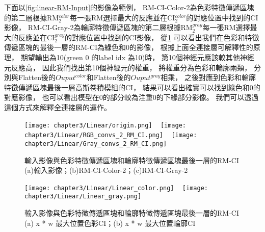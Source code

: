 \documentclass[class=NCU_thesis, crop=false]{standalone}
\begin{document}
下面以\cref{fig:linear-RM-Input}的影像為範例，
RM-CI-Color-2為色彩特徵傳遞區塊的第二層根據RM$^{color}_{2}$每一張RM選擇最大的反應並在CI$^{color}_{2}$的對應位置中找到的CI影像，
RM-CI-Gray-2為輪廓特徵傳遞區塊的第二層根據RM$^{gray}_{2}$每一張RM選擇最大的反應並在CI$^{gray}_{2}$的對應位置中找到的CI影像，
從\cref{fig:RM-CI}  可以看出我們在色彩和特徵傳遞區塊的最後一層的RM-CI為綠色和0的影像，
根據上面全連接層可解釋性的原理，
期望輸出為10(green 0 的label idx 為10)時，
第10個神經元應該較其他神經元反應高，
因此我們找出第10個神經元的權重，
將權重分為色彩和輪廓兩類，
分別與Flatten後的$Ouput^{color}$和Flatten後的$Ouput^{gray}$相乘，
之後對應到色彩和輪廓特徵傳遞區塊最後一層高斯卷積模組的CI，
結果可以看出確實可以找到綠色和0的對應影像，
也可以看出模型在0的部分較為注重0的下緣部分影像。
我們可以透過這個方式來解釋全連接層的運作。

\begin{figure}[H]
    \centering
    \subcaptionbox
        {
        \label{fig:linear-RM-Input}}
        {\texttt{[image: chapter3/Linear/origin.png]}}
    ~
    \subcaptionbox
        {
        \label{fig:linear-RM-CI-color-2}}
        {\texttt{[image: chapter3/Linear/RGB\_convs\_2\_RM\_CI.png]}}
    ~
    \subcaptionbox
        {
        \label{fig:linear-RM-CI-gray-2}}
        {\texttt{[image: chapter3/Linear/Gray\_convs\_2\_RM\_CI.png]}}
    \caption{輸入影像與色彩特徵傳遞區塊和輪廓特徵傳遞區塊最後一層的RM-CI (a)輸入影像；(b)RM-CI-Color-2；(c)RM-CI-Gray-2}
    \label{fig:RM-CI}
\end{figure}

\begin{figure}[H]
    \centering
    \subcaptionbox
        {
        \label{fig:linear-rgb}}
        {\texttt{[image: chapter3/Linear/Linear\_color.png]}}
    ~
    \subcaptionbox
        {
        \label{fig:linear-gray}}
        {\texttt{[image: chapter3/Linear/Linear\_gray.png]}}
    \caption{輸入影像與色彩特徵傳遞區塊和輪廓特徵傳遞區塊最後一層的RM-CI (a) x * w 最大位置色彩CI；(b) x * w 最大位置輪廓CI}
    \label{fig:Linear-w-x}
\end{figure}
\end{document}

